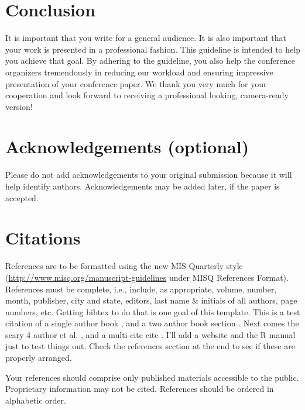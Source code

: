 \documentclass{icis}
\begin{document}
\section{Conclusion}
It is important that you write for a general audience. It is also important that your work is presented in a professional fashion. This guideline is intended to help you achieve that goal. By adhering to the guideline, you also help the conference organizers tremendously in reducing our workload and ensuring impressive presentation of your conference paper. We thank you very much for your cooperation and look forward to receiving a professional looking, camera-ready version!

\section{Acknowledgements (optional)}
Please do not add acknowledgements to your original submission because it will help identify authors. Acknowledgements may be added later, if the paper is accepted.

\section{Citations}

References are to be formatted using the new MIS Quarterly style (\url{http://www.misq.org/manuscript-guidelines} under MISQ References Format). References must be complete, i.e., include, as appropriate, volume, number, month, publisher, city and state, editors, last name \& initials of all authors, page numbers, etc. Getting bibtex to do that is one goal of this
template. This is a test citation of a single author book
\autocite{bonini_simulation_1963}, and a two author book section
\autocite{chenhall_formal_1989}. Next comes the scary 4 author et
al. \autocite{zhang2006}, and a multi-cite cite \autocite{bonini_simulation_1963,
  ackoff_management_1961}.  I'll add a website \autocite{Ahlers2013} and the R manual
\autocite{R2014} just to test things out. Check the references section at the end to see if these are properly arranged.

Your references should comprise only published materials accessible to the public. Proprietary information may not be cited.
References should be ordered in alphabetic order.

% 
% 

\printbibliography
\end{document}
